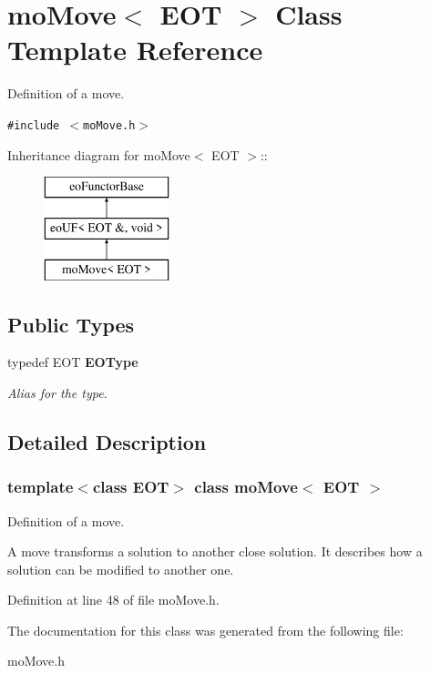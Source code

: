\section{mo\-Move$<$ EOT $>$ Class Template Reference}
\label{classmo_move}
Definition of a move.  


{\tt \#include $<$mo\-Move.h$>$}

Inheritance diagram for mo\-Move$<$ EOT $>$::\begin{figure}[H]
\begin{center}
\leavevmode
\includegraphics[height=3cm]{classmo_move}
\end{center}
\end{figure}
\subsection*{Public Types}
\begin{CompactItemize}
\item 
typedef EOT \bf{EOType}\label{classmo_move_7fb853a91ba1319530529e515380bbba}

\begin{CompactList}\small\item\em Alias for the type. \item\end{CompactList}\end{CompactItemize}


\subsection{Detailed Description}
\subsubsection*{template$<$class EOT$>$ class mo\-Move$<$ EOT $>$}

Definition of a move. 

A move transforms a solution to another close solution. It describes how a solution can be modified to another one. 



Definition at line 48 of file mo\-Move.h.

The documentation for this class was generated from the following file:\begin{CompactItemize}
\item 
mo\-Move.h\end{CompactItemize}
